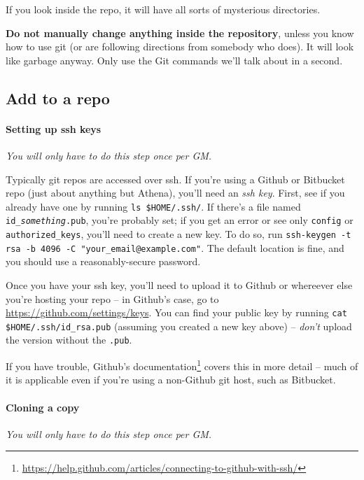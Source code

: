 \documentclass[green]{testgame}
\begin{document}

If you look inside the repo, it will have all sorts of mysterious directories.


\textbf{Do not manually change anything inside the repository}, unless you know how to use git (or are following directions from somebody who does). It will look like garbage anyway. Only use the Git commands we'll talk about in a second.

\subsection{Add \gametex{} to a repo}

\paragraph*{Setting up ssh keys} \emph{You will only have to do this step once per GM.}

Typically git repos are accessed over ssh. If you're using a Github or Bitbucket repo (just about anything but Athena), you'll need an \emph{ssh key}. First, see if you already have one by running \texttt{ls \$HOME/.ssh/}. If there's a file named \texttt{id\_\emph{something}.pub}, you're probably set; if you get an error or see only \texttt{config} or \texttt{authorized\_keys}, you'll need to create a new key. To do so, run \texttt{ssh-keygen -t rsa -b 4096 -C "your\_email@example.com"}. The default location is fine, and you should use a reasonably-secure password.

Once you have your ssh key, you'll need to upload it to Github or whereever else you're hosting your repo -- in Github's case, go to \url{https://github.com/settings/keys}. You can find your public key by running \texttt{cat \$HOME/.ssh/id\_rsa.pub} (assuming you created a new key above) -- \emph{don't} upload the version without the \texttt{.pub}.

If you have trouble, Github's documentation\footnote{\url{https://help.github.com/articles/connecting-to-github-with-ssh/}} covers this in more detail -- much of it is applicable even if you're using a non-Github git host, such as Bitbucket.

\paragraph*{Cloning a copy} \emph{You will only have to do this step once per GM.}
\end{document}
